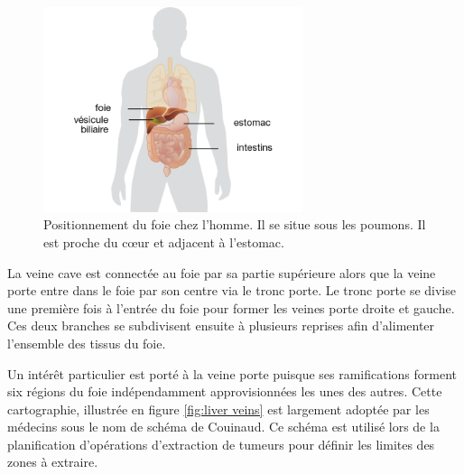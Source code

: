 \begin{figure}[!ht]
    \centering
    \includegraphics[height=6cm]{Images/Liver.png}
    \caption[Hello world]{Positionnement du foie chez l'homme. Il se situe sous les poumons. Il est proche du cœur et adjacent à l'estomac.\protect \footnotemark}
    \label{fig:liver}
  \end{figure}



La veine cave est connectée au foie par sa partie supérieure alors que la veine porte entre dans le foie par son centre via le tronc porte. Le tronc porte se divise une première fois à l'entrée du foie pour former les veines  porte droite et gauche. Ces deux branches se subdivisent ensuite à plusieurs reprises afin d'alimenter l'ensemble des tissus du foie. 

Un intérêt particulier est porté à la veine porte puisque ses ramifications forment six régions du foie indépendamment approvisionnées les unes des autres. Cette cartographie, illustrée en figure \ref{fig:liver veins} est largement adoptée par les médecins sous le nom de schéma de Couinaud. Ce schéma est utilisé lors de la planification d'opérations d'extraction de tumeurs pour définir les limites des zones à extraire.

